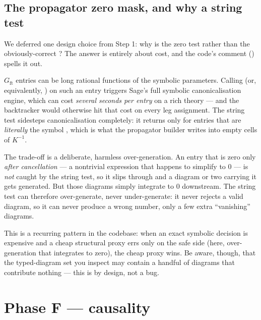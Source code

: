 \subsection{The propagator zero mask, and why a string test}\label{sec:ta-zeromask}

We deferred one design choice from Step 1: why is the zero test
 rather than the obviously-correct
? The answer is entirely about cost, and the code's
comment () spells it out.

$G_{\mathrm{ft}}$ entries can be long rational functions of the symbolic
parameters. Calling  (or, equivalently, ) on
such an entry triggers Sage's full symbolic canonicalisation engine, which can
cost \emph{several seconds per entry} on a rich theory --- and the backtracker
would otherwise hit that cost on every leg assignment. The string test sidesteps
canonicalisation completely: it returns  only for entries that are
\emph{literally} the symbol , which is what the propagator builder
writes into empty cells of $K^{-1}$.

The trade-off is a deliberate, harmless over-generation. An entry that is zero
only \emph{after cancellation} --- a nontrivial expression that happens to
simplify to $0$ --- is \emph{not} caught by the string test, so it slips through
and a diagram or two carrying it gets generated. But those diagrams simply
integrate to $0$ downstream. The string test can therefore over-generate, never
under-generate: it never rejects a valid diagram, so it can never produce a wrong
number, only a few extra ``vanishing'' diagrams.

\begin{note}
This is a recurring pattern in the codebase: when an exact symbolic decision is
expensive and a cheap structural proxy errs only on the safe side (here,
over-generation that integrates to zero), the cheap proxy wins. Be aware, though,
that the typed-diagram set you inspect may contain a handful of diagrams that
contribute nothing --- this is by design, not a bug.
\end{note}

\section{Phase F --- causality}\label{sec:ta-causality}

